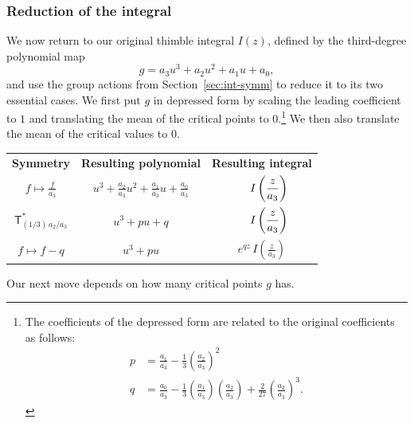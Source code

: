 \documentclass{article}
\theoremstyle{definition}
\theoremstyle{plain}
\begin{document}
\subsubsection{Reduction of the integral}
We now return to our original thimble integral $I(z)$, defined by the third-degree polynomial map
\[ g = a_3 u^3 + a_2 u^2 + a_1 u + a_0, \]
and use the group actions from Section~\ref{sec:int-symm} to reduce it to its two essential cases. We first put $g$ in depressed form by scaling the leading coefficient to $1$ and translating the mean of the critical points to $0$.\footnote{The coefficients of the depressed form are related to the original coefficients as follows:
\begin{align*}
p & = \frac{a_1}{a_3} - \frac{1}{3} \left(\frac{a_2}{a_3}\right)^2 \\
q & = \frac{a_0}{a_3} - \frac{1}{3} \left(\frac{a_1}{a_3}\right)\left(\frac{a_2}{a_3}\right) + \frac{2}{27} \left(\frac{a_2}{a_3}\right)^3.
\end{align*}} We then also translate the mean of the critical values to $0$.
\begin{center}
\begin{tabular}{c|c|c}
\textbf{Symmetry} & \textbf{Resulting polynomial} & \textbf{Resulting integral} \\[2mm]
$\displaystyle f \mapsto \frac{f}{a_3}$ & $\displaystyle u^3 + \frac{a_2}{a_3} u^2 + \frac{a_1}{a_3} u + \frac{a_0}{a_3}$ & $\displaystyle \hphantom{e^{qz}} I\left(\frac{z}{a_3}\right)$ \\[5mm]
$\displaystyle \mathsf{T}_{(1/3)\,a_2/a_3}^*$ & $\displaystyle u^3 + pu + q$ & $\displaystyle \hphantom{e^{qz}} I\left(\frac{z}{a_3}\right)$ \\[5mm]
$\displaystyle f \mapsto f - q$ & $\displaystyle u^3 + pu$ & $\displaystyle e^{qz}\,I\left(\frac{z}{a_3}\right)$ \\[5mm]
\end{tabular}
\end{center}
Our next move depends on how many critical points $g$ has.
\end{document}
